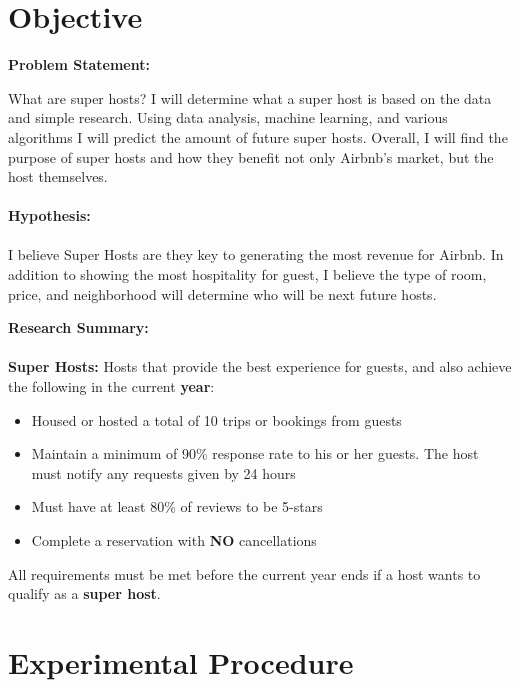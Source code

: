 \documentclass[10pt,letterpapter]{article}
\begin{document}
\section{Objective}

\textbf{Problem Statement:}
\begin{paragraph}
\indent 
What are super hosts? I will determine what a super host is based on the data and simple research. Using data analysis, machine learning, and various algorithms I will predict the amount of future super hosts. Overall, I will find the purpose of super hosts and how they benefit not only Airbnb's market, but the host themselves.
\\ \\
\textbf{Hypothesis:}
\\ \\
\indent \indent I believe Super Hosts are they key to generating the most revenue for Airbnb. In addition to showing the most hospitality for guest, I believe the type of room, price, and neighborhood will determine who will be next future hosts.
\end{paragraph}

\textbf{Research Summary:}
\\ \\
\textbf{Super Hosts:} Hosts that provide the best experience for guests, and also achieve the following in the \indent \indent \indent \indent \space \space \space \space current \textbf{year}:

\begin{itemize}
	\item Housed or hosted a total of 10 trips or bookings from guests
	\item Maintain a minimum of 90\% response rate to his or her guests. The host must notify any requests given by 24 hours
	\item Must have at least 80\% of reviews to be 5-stars
	\item Complete a reservation with \textbf{NO} cancellations
\end{itemize}

All requirements must be met before the current year ends if a host wants to qualify as a \textbf{super host}.

\section{Experimental Procedure}
\end{document}
